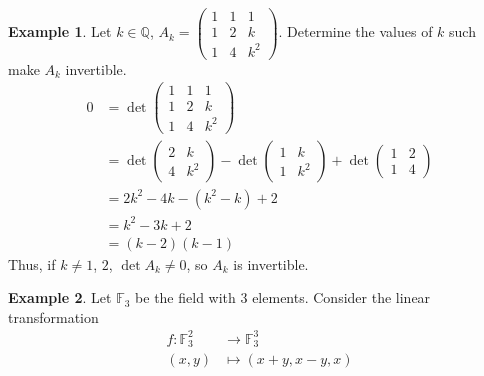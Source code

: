 \documentclass[letterpaper,12pt]{article}
\theoremstyle{definition}
\newtheorem*{example}{Example}
\begin{document}
\begin{example}
Let $k \in \mathbb{Q}$, $A_k = \begin{pmatrix} 1 & 1 & 1 \\ 1 & 2 & k \\ 1 & 4 & k^2 \end{pmatrix}$. Determine the values of $k$ such make $A_k$ invertible.
\begin{align*}
    0 & = \det{\begin{pmatrix} 1 & 1 & 1 \\ 1 & 2 & k \\ 1 & 4 & k^2 \end{pmatrix}} \\
    & = \det{\begin{pmatrix} 2 & k \\ 4 & k^2 \end{pmatrix}} - \det{\begin{pmatrix} 1 & k \\ 1 & k^2 \end{pmatrix}} + \det{\begin{pmatrix} 1 & 2 \\ 1 & 4 \end{pmatrix}} \\
    & = 2k^2 - 4k - (k^2 - k) + 2 \\
    & = k^2 - 3k + 2 \\
    & = (k-2)(k-1)
\end{align*}
Thus, if $k \neq 1$, $2$, $\det{A_k} \neq 0$, so $A_k$ is invertible.
\end{example}


\begin{example}
Let $\mathbb{F}_3$ be the field with $3$ elements. Consider the linear transformation
\begin{align*}
    f: \mathbb{F}_3^2 & \longrightarrow \mathbb{F}_3^3 \\
    (x,y) & \longmapsto (x+y,x-y,x)
\end{align*}
\end{example}
\end{document}
